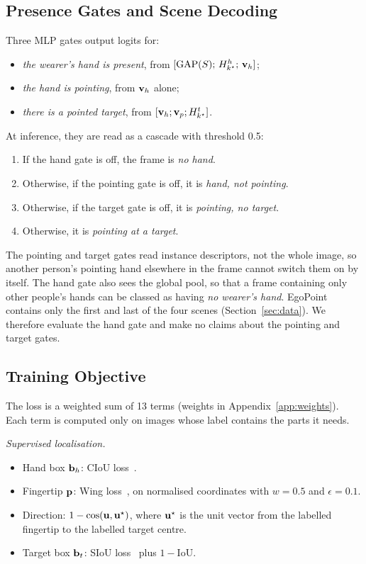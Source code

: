 \subsection{Presence Gates and Scene Decoding}\label{sec:gates}
Three MLP gates output logits for:
\begin{itemize}
\item \emph{the wearer's hand is present}, from $[\mathrm{GAP}(S);\,H^h_{k^\star};\,\mathbf{v}_h]$;
\item \emph{the hand is pointing}, from $\mathbf{v}_h$ alone;
\item \emph{there is a pointed target}, from $[\mathbf{v}_h;\mathbf{v}_p;H^t_{k^\star}]$.
\end{itemize}
At inference, they are read as a cascade with threshold 0.5:
\begin{enumerate}
\item If the hand gate is off, the frame is \emph{no hand}.
\item Otherwise, if the pointing gate is off, it is \emph{hand, not pointing}.
\item Otherwise, if the target gate is off, it is \emph{pointing, no target}.
\item Otherwise, it is \emph{pointing at a target}.
\end{enumerate}
The pointing and target gates read instance descriptors, not the whole image, so another person's pointing hand elsewhere in the frame cannot switch them on by itself. The hand gate also sees the global pool, so that a frame containing only other people's hands can be classed as having \emph{no wearer's hand}. EgoPoint contains only the first and last of the four scenes (Section~\ref{sec:data}). We therefore evaluate the hand gate and make no claims about the pointing and target gates.

\subsection{Training Objective}\label{sec:losses}
The loss is a weighted sum of 13 terms (weights in Appendix~\ref{app:weights}). Each term is computed only on images whose label contains the parts it needs.

\emph{Supervised localisation.}
\begin{itemize}
\item Hand box $\mathbf{b}_h$: CIoU loss~\cite{zheng2020distance}.
\item Fingertip $\mathbf{p}$: Wing loss~\cite{feng2018wing}, on normalised coordinates with $w{=}0.5$ and $\epsilon{=}0.1$.
\item Direction: $1-\cos(\mathbf{u},\mathbf{u}^\star)$, where $\mathbf{u}^\star$ is the unit vector from the labelled fingertip to the labelled target centre.
\item Target box $\mathbf{b}_t$: SIoU loss~\cite{gevorgyan2022siou} plus $1-\mathrm{IoU}$.
\end{itemize}

